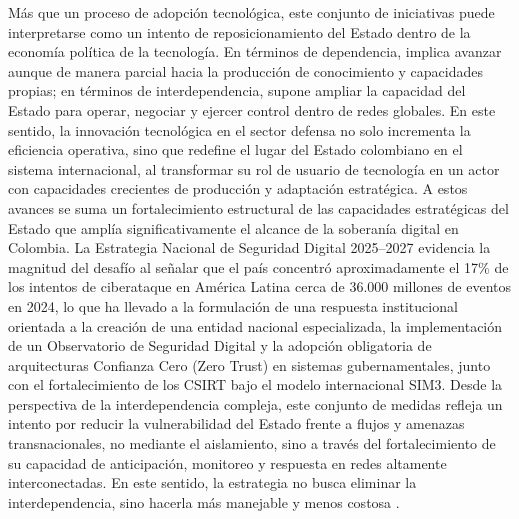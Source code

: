 Más que un proceso de adopción tecnológica, este conjunto de iniciativas puede interpretarse como un intento de reposicionamiento del Estado dentro de la economía política de la tecnología. En términos de dependencia, implica avanzar aunque de manera parcial hacia la producción de conocimiento y capacidades propias; en términos de interdependencia, supone ampliar la capacidad del Estado para operar, negociar y ejercer control dentro de redes globales. En este sentido, la innovación tecnológica en el sector defensa no solo incrementa la eficiencia operativa, sino que redefine el lugar del Estado colombiano en el sistema internacional, al transformar su rol de usuario de tecnología en un actor con capacidades crecientes de producción y adaptación estratégica.
A estos avances se suma un fortalecimiento estructural de las capacidades estratégicas del Estado que amplía significativamente el alcance de la soberanía digital en Colombia. La Estrategia Nacional de Seguridad Digital 2025--2027 evidencia la magnitud del desafío al señalar que el país concentró aproximadamente el 17\% de los intentos de ciberataque en América Latina cerca de 36.000 millones de eventos en 2024, lo que ha llevado a la formulación de una respuesta institucional orientada a la creación de una entidad nacional especializada, la implementación de un Observatorio de Seguridad Digital y la adopción obligatoria de arquitecturas Confianza Cero (Zero Trust) en sistemas gubernamentales, junto con el fortalecimiento de los CSIRT bajo el modelo internacional SIM3. Desde la perspectiva de la interdependencia compleja, este conjunto de medidas refleja un intento por reducir la vulnerabilidad del Estado frente a flujos y amenazas transnacionales, no mediante el aislamiento, sino a través del fortalecimiento de su capacidad de anticipación, monitoreo y respuesta en redes altamente interconectadas. En este sentido, la estrategia no busca eliminar la interdependencia, sino hacerla más manejable y menos costosa \parencite{mintic_seguridad_digital_2025,keohane_nye_power_2011}.

